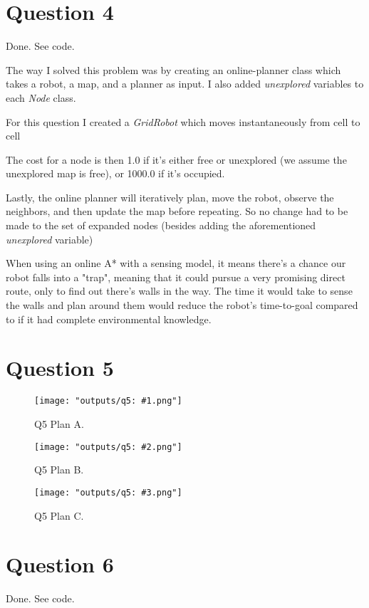 \documentclass[11pt]{article}
\begin{document}
\section{Question 4}
Done. See code.

The way I solved this problem was by creating an online-planner class which takes a robot, a map, and a planner as input. I also added \textit{unexplored} variables to each \textit{Node} class. 

For this question I created a \textit{GridRobot} which moves instantaneously from cell to cell

The cost for a node is then 1.0 if it's either free or unexplored (we assume the unexplored map is free), or 1000.0 if it's occupied.

Lastly, the online planner will iteratively plan, move the robot, observe the neighbors, and then update the map before repeating. So no change had to be made to the set of expanded nodes (besides adding the aforementioned \textit{unexplored} variable)

When using an online A* with a sensing model, it means there's a chance our robot falls into a "trap", meaning that it could pursue a very promising direct route, only to find out there's walls in the way. The time it would take to sense the walls and plan around them would reduce the robot's time-to-goal compared to if it had complete environmental knowledge.


\section{Question 5}

\begin{figure}[H]
    \centering
    \texttt{[image: "outputs/q5: \#1.png"]}
    \caption{Q5  Plan A.}
\end{figure}

\begin{figure}[H]
    \centering
    \texttt{[image: "outputs/q5: \#2.png"]}
    \caption{Q5  Plan B.}
\end{figure}

\begin{figure}[H]
    \centering
    \texttt{[image: "outputs/q5: \#3.png"]}
    \caption{Q5  Plan C.}
\end{figure}

\section{Question 6}
Done. See code.
\end{document}
